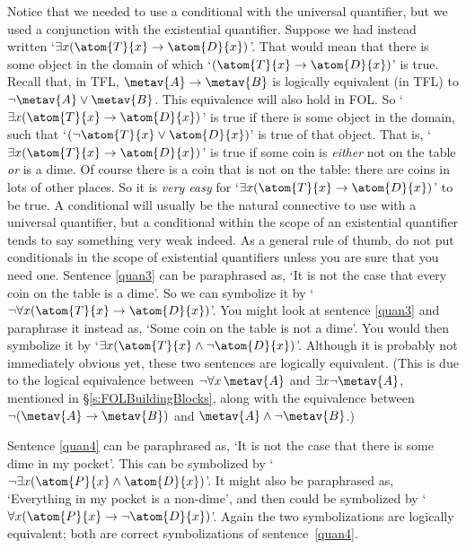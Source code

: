 Notice that we needed to use a conditional with the universal quantifier, but we used a conjunction with the existential quantifier. Suppose we had instead written `$\exists x(\atom{T}{x} \eif \atom{D}{x})$'. That would mean that there is some object in the domain of which `$(\atom{T}{x} \eif \atom{D}{x})$' is true. Recall that, in TFL, $\metav{A} \eif \metav{B}$ is logically equivalent (in TFL) to $\enot\metav{A} \eor \metav{B}$. This equivalence will also hold in FOL. So `$\exists x(\atom{T}{x} \eif \atom{D}{x})$' is true if there is some object in the domain, such that `$(\enot \atom{T}{x} \eor \atom{D}{x})$' is true of that object. That is, `$\exists x (\atom{T}{x} \eif \atom{D}{x})$' is true if some coin is \emph{either} not on the table \emph{or} is a dime. Of course there is a coin that is not on the table: there are coins in  lots of other places. So it is \emph{very easy} for `$\exists x(\atom{T}{x} \eif \atom{D}{x})$' to be true. A conditional will usually be the natural connective to use with a universal quantifier, but a conditional within the scope of an existential quantifier tends to say something very weak indeed. As a general rule of thumb, do not put conditionals in the scope of existential quantifiers unless you are sure that you need one.
Sentence \ref{quan3} can be paraphrased as, `It is not the case that every coin on the table is a dime'. So we can symbolize it by `$\enot \forall x(\atom{T}{x} \eif \atom{D}{x})$'. You might look at sentence \ref{quan3} and paraphrase it instead as, `Some coin on the table is not a dime'. You would then symbolize it by `$\exists x(\atom{T}{x} \eand \enot \atom{D}{x})$'. Although it is probably not immediately obvious yet, these two sentences are logically equivalent. (This is due to the logical equivalence between $\enot\forall x\,\metav{A}$ and $\exists x\enot\metav{A}$, mentioned in \S\ref{s:FOLBuildingBlocks}, along with the equivalence between $\enot(\metav{A}\eif\metav{B})$ and $\metav{A}\eand\enot\metav{B}$.)

Sentence \ref{quan4} can be paraphrased as, `It is not the case that there is some dime in my pocket'. This can be symbolized by `$\enot\exists x(\atom{P}{x} \eand \atom{D}{x})$'. It might also be paraphrased as, `Everything in my pocket is a non-dime', and then could be symbolized by `$\forall x(\atom{P}{x} \eif \enot \atom{D}{x})$'. Again the two symbolizations are logically equivalent; both are correct symbolizations of sentence~\ref{quan4}.

